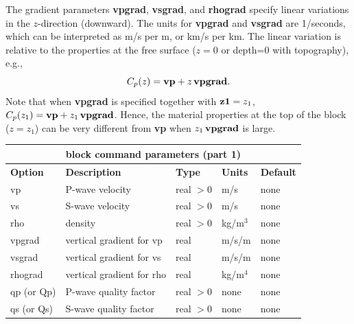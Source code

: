 \documentclass[11pt]{report}
\begin{document}
The gradient parameters {\bf vpgrad}, {\bf vsgrad}, and {\bf rhograd} specify linear variations in the
$z$-direction (downward). The units for {\bf vpgrad} and {\bf vsgrad} are 1/seconds, which
can be interpreted as m/s per m, or km/s per km. The linear variation is relative to the properties at
the free surface ($z=0$ or depth=0 with topography), e.g.,
\[
C_p(z) = {\bf vp} + z \, {\bf vpgrad}.
\]
Note that when {\bf vpgrad} is specified together with ${\bf z1}=z_1$, $C_p(z_1) = {\bf vp} + z_1\,
{\bf vpgrad}$. Hence, the material properties at the top of the block ($z=z_1$) can be very
different from {\bf vp} when $z_1\, {\bf vpgrad}$ is large.
\begin{center}
\begin{tabular}{|l|p{8cm}|l|l|l|} \hline
\multicolumn{5}{|c|}{\bf block command parameters (part 1)}\\ \hline
{\bf Option} & {\bf Description}          & {\bf Type} & {\bf Units} & {\bf Default} \\ \hline 
\hline
vp          & P-wave velocity           & real $>0$  & m/s      & none \\ \hline
vs          & S-wave velocity           & real $>0$  & m/s      & none \\ \hline
rho         & density                   & real $>0$  & kg/m$^3$ & none \\ \hline
vpgrad      & vertical gradient for vp  & real       & m/s/m    & none \\ \hline
vsgrad      & vertical gradient for vs  & real       & m/s/m    & none \\ \hline
rhograd     & vertical gradient for rho & real       & kg/m$^4$ & none \\ \hline
qp (or Qp)  & P-wave quality factor     & real $>0$  & none     & none \\ \hline
qs (or Qs)  & S-wave quality factor     & real $>0$  & none    & none \\ \hline
\end{tabular}
\end{center}
%
\end{document}
